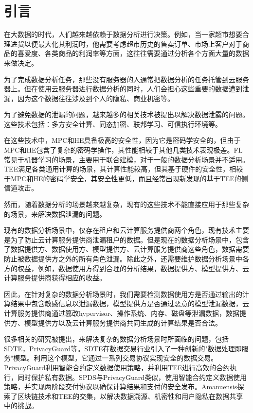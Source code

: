 \section{引言}
在大数据的时代，人们越来越依赖于数据分析进行决策。例如，当一家超市想要合理进货以便最大化其利润时，他需要考虑超市历史的售卖订单、市场上客户对于商品的喜爱度、各类商品的利润率等方面，这往往需要通过分析各个方面大量的数据来做决定。

为了完成数据分析任务，那些没有服务器的人通常把数据分析的任务托管到云服务器上。但在使用云服务器进行数据分析的同时，人们会担心这些重要的数据遭到泄漏，因为这个数据往往涉及到个人的隐私、商业机密等。

为了避免数据的泄漏的问题，越来越多的相关技术被提出以解决数据泄露的问题。这些技术包括：多方安全计算、同态加密、联邦学习、可信执行环境等。

在这些技术中，MPC和HE具备极高的安全性，因为它是密码学安全的，但由于MPC和HE包含了复杂的密码学操作，其性能相较于其他几类技术表现极差。FL常见于机器学习的场景，主要用于联合建模，对于一般的数据分析场景并不适用。TEE满足各类通用计算的场景，其计算性能较高，但其基于硬件的安全性，相较于MPC和HE的密码学安全，其安全性更低，而且经常出现新发现的基于TEE的侧信道攻击。

然而，随着数据分析的场景越来越复杂，现有的这些技术不能直接应用于那些复杂的场景，来解决数据泄漏的问题。

现有的数据分析场景中，仅存在租户和云计算服务提供商两个角色，现有技术主要是为了防止云计算服务提供商泄漏租户的数据。但是现在的数据分析场景中，包含了数据提供方、数据使用方、模型提供方、云计算服务提供商这些角色，数据需要防止被数据提供方之外的所有角色泄漏。除此之外，还需要维护数据分析场景中各方的权益，例如，数据使用方得到合理的分析结果，数据提供方、模型提供方、云计算服务提供商获得相应的收益。

因此，在针对复杂的数据分析场景时，我们需要检测数据使用方是否通过输出的计算结果中包含敏感信息以泄漏数据，模型提供方是否通过恶意的模型泄漏数据，云计算服务提供商通过篡改hypervisor、操作系统、内存、磁盘等泄漏数据，数据提供方、模型提供方以及云计算服务提供商共同生成的计算结果是否合法。

很多相关的研究被提出，来解决复杂的数据分析场景时所面临的问题，包括SDTE，PrivacyGuard等。SDTE在数据交易行业引入了一种创新的"数据处理即服务"模型。利用这个模型，它通过一系列交易协议实现安全的数据交易。PrivacyGuard利用智能合约定义数据使用策略，并利用TEE进行高效的合约执行，同时保护私有数据。SPDS与PrivacyGuard类似，使用智能合约定义数据使用策略，并实现两阶段交付协议以确保计算结果和支付的安全发布。Amanuensis探索了区块链技术和TEE的交集，以解决数据溯源、机密性和用户隐私在数据共享中的挑战。

